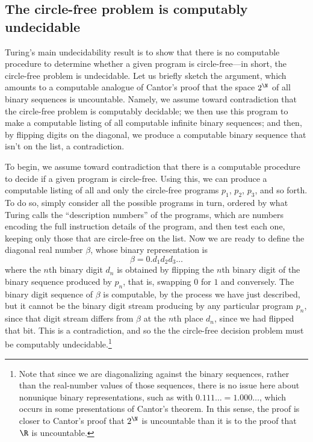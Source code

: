 \documentclass[12pt]{amsart}
\begin{document}
\subsection{The circle-free problem is computably undecidable}

Turing's main undecidability result is to show that there is no computable procedure to determine whether a given program is circle-free---in short, the circle-free problem is undecidable. Let us briefly sketch the argument, which amounts to a computable analogue of Cantor's proof that the space $2^\N$ of all binary sequences is uncountable. Namely, we assume toward contradiction that the circle-free problem is computably decidable; we then use this program to make a computable listing of all computable infinite binary sequences; and then, by flipping digits on the diagonal, we produce a computable binary sequence that isn't on the list, a contradiction. 

To begin, we assume toward contradiction that there is a computable procedure to decide if a given program is circle-free. Using this, we can produce 
a computable listing of all and only the circle-free programs $p_1$, $p_2$, $p_3$, and so forth. To do so, simply consider all the possible programs in turn, ordered by what Turing calls the ``description numbers'' of the programs, which are numbers encoding the full instruction details of the program, and then test each one, keeping only those that are circle-free on the list. Now we are ready to define the diagonal real number $\beta$, whose binary representation is
  $$\beta=0.d_1d_2d_3\ldots$$
where the $n$th binary digit $d_n$ is obtained by flipping the $n$th binary digit of the binary sequence produced by $p_n$, that is, swapping $0$ for $1$ and conversely. The binary digit sequence of $\beta$ is computable, by the process we have just  described, but it cannot be the binary digit stream producing by any particular program $p_n$, since that digit stream differs from $\beta$ at the $n$th place $d_n$, since we had flipped that bit. This is a contradiction, and so the the circle-free decision problem must be computably undecidable.\footnote{Note that since we are diagonalizing against the binary sequences, rather than the real-number values of those sequences, there is no issue here about nonunique binary representations, such as with $0.111\ldots=1.000\ldots$, which occurs in some presentations of Cantor's theorem. In this sense, the proof is closer to Cantor's proof that $2^\N$ is uncountable than it is to the proof that $\R$ is uncountable.}
\end{document}
